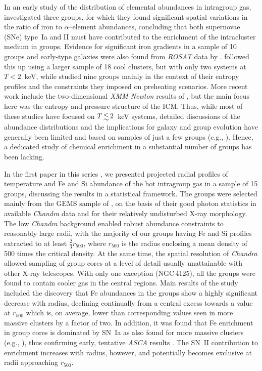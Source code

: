 \documentclass[useAMS,usenatbib]{mn2e}
\begin{document}
In an early study of the distribution of elemental abundances in 
intragroup gas, \citet{fino99} investigated three groups, for which they 
found significant spatial variations in the ratio of iron to
$\alpha$--element abundances, concluding that both supernovae (SNe)
type~Ia and II must have contributed to the enrichment of the
intracluster medium in groups. Evidence for significant iron gradients
in a sample of 10 groups and early-type galaxies were also found from
{\em ROSAT} data by \citet{buot00b}. \citet*{fino01} followed this up
using a larger sample of 18 cool clusters, but with only two systems
at $T<2$~keV, while \citet{fino02} studied nine groups mainly in the
context of their entropy profiles and the constraints they imposed on
preheating scenarios. More recent work include the two-dimensional
{\em XMM-Newton} results of \citet{fino06,fino07}, but the main focus
here was the entropy and pressure structure of the ICM.  Thus, while
most of these studies have focused on $T\la 2$~keV systems, detailed
discussions of the abundance distributions and the implications for
galaxy and group evolution have generally been limited and based on
samples of just a few groups (e.g., \citealt{fino99}). Hence, a
dedicated study of chemical enrichment in a substantial number of
groups has been lacking.

In the first paper in this series \citep[hereafter Paper~I]{rasm07},
we presented projected radial profiles of temperature and Fe and Si
abundance of the hot intragroup gas in a sample of 15 groups,
discussing the results in a statistical framework. The groups were
selected mainly from the GEMS sample of \citet{osmo04}, on the basis
of their good photon statistics in available {\em Chandra} data and
for their relatively undisturbed X-ray morphology. The low {\em
Chandra} background enabled robust abundance constraints to reasonably
large radii, with the majority of our groups having Fe and Si profiles
extracted to at least $\frac{2}{3}r_{500}$, where $r_{500}$ is the
radius enclosing a mean density of 500 times the critical density.  At
the same time, the spatial resolution of {\em Chandra} allowed
sampling of group cores at a level of detail usually unattainable with
other X-ray telescopes.  With only one exception (NGC\,4125), all the
groups were found to contain cooler gas in the central regions. Main
results of the study included the discovery that Fe abundances in the
groups show a highly significant decrease with radius, declining
continually from a central excess towards a value at $r_{500}$ which
is, on average, lower than corresponding values seen in more massive
clusters by a factor of two.  In addition, it was found that Fe
enrichment in group cores is dominated by SN~Ia as also found for more
massive clusters (e.g., \citealt{degr04}), thus confirming early,
tentative {\em ASCA} results \citep{fino00}. The SN~II contribution to
enrichment increases with radius, however, and potentially becomes
exclusive at radii approaching $r_{500}$.
\end{document}
